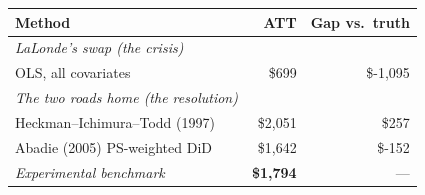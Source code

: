 \begin{tabular}{lrr}
\toprule
\textbf{Method} & \textbf{ATT} & \textbf{Gap vs.\ truth} \\
\midrule
\textit{LaLonde's swap (the crisis)} & & \\
\quad OLS, all covariates              & \$699 & \textcolor{rmburgundy}{\$-1,095} \\
\midrule
\textit{The two roads home (the resolution)} & & \\
\quad Heckman--Ichimura--Todd (1997)    & \$2,051 & \$257 \\
\quad Abadie (2005) PS-weighted DiD     & \$1,642 & \$-152 \\
\midrule
\textit{Experimental benchmark}        & \textcolor{rmgold}{\textbf{\$1,794}} & --- \\
\bottomrule
\end{tabular}
